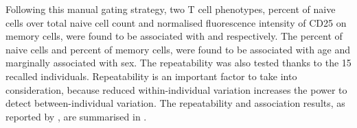 Following this manual gating strategy, two T cell phenotypes, percent of \positive naive cells over total naive cell count 
and normalised fluorescence intensity of CD25 on memory cells, were found to be associated with  and  respectively.
The percent of \positive naive cells and percent of memory cells, were found to be associated with age and marginally associated with sex.
The repeatability was also tested thanks to the 15 recalled individuals.
Repeatability is an important factor to take into consideration, because reduced within-individual variation increases the power to detect between-individual variation.  
The repeatability and association results, as reported by \citet{Dendrou:2009dv}, are summarised in .  



